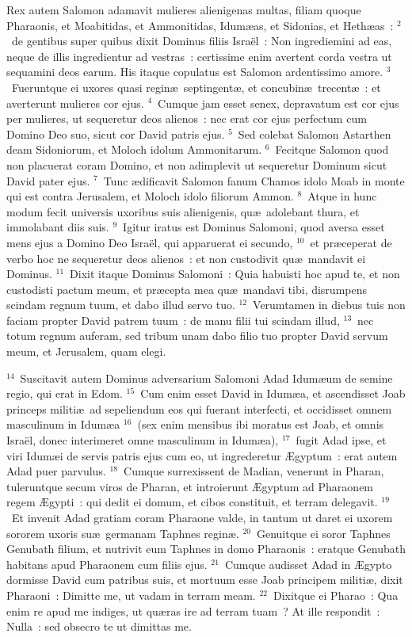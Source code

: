 \bchapter
\lettrine[lines=3,image=true,loversize=0.05,lraise=-0.03]{R}{}ex autem Salomon adamavit mulieres alienigenas multas, filiam quoque Pharaonis, et Moabitidas, et Ammonitidas, Idum\ae as, et Sidonias, et Heth\ae as~:
${}^{2}$~de gentibus super quibus dixit Dominus filiis Isra\"el~: Non ingrediemini ad eas, neque de illis ingredientur ad vestras~: certissime enim avertent corda vestra ut sequamini deos earum. His itaque copulatus est Salomon ardentissimo amore.
${}^{3}$~Fueruntque ei uxores quasi regin\ae\ septingent\ae , et concubin\ae\ trecent\ae~: et averterunt mulieres cor ejus.
${}^{4}$~Cumque jam esset senex, depravatum est cor ejus per mulieres, ut sequeretur deos alienos~: nec erat cor ejus perfectum cum Domino Deo suo, sicut cor David patris ejus.
${}^{5}$~Sed colebat Salomon Astarthen deam Sidoniorum, et Moloch idolum Ammonitarum.
${}^{6}$~Fecitque Salomon quod non placuerat coram Domino, et non adimplevit ut sequeretur Dominum sicut David pater ejus.
${}^{7}$~Tunc \ae dificavit Salomon fanum Chamos idolo Moab in monte qui est contra Jerusalem, et Moloch idolo filiorum Ammon.
${}^{8}$~Atque in hunc modum fecit universis uxoribus suis alienigenis, qu\ae\ adolebant thura, et immolabant diis suis.
${}^{9}$~Igitur iratus est Dominus Salomoni, quod aversa esset mens ejus a Domino Deo Isra\"el, qui apparuerat ei secundo,
${}^{10}$~et pr\ae ceperat de verbo hoc ne sequeretur deos alienos~: et non custodivit qu\ae\ mandavit ei Dominus.
${}^{11}$~Dixit itaque Dominus Salomoni~: Quia habuisti hoc apud te, et non custodisti pactum meum, et pr\ae cepta mea qu\ae\ mandavi tibi, disrumpens scindam regnum tuum, et dabo illud servo tuo.
${}^{12}$~Verumtamen in diebus tuis non faciam propter David patrem tuum~: de manu filii tui scindam illud,
${}^{13}$~nec totum regnum auferam, sed tribum unam dabo filio tuo propter David servum meum, et Jerusalem, quam elegi.


${}^{14}$~Suscitavit autem Dominus adversarium Salomoni Adad Idum\ae um de semine regio, qui erat in Edom.
${}^{15}$~Cum enim esset David in Idum\ae a, et ascendisset Joab princeps militi\ae\ ad sepeliendum eos qui fuerant interfecti, et occidisset omnem masculinum in Idum\ae a
${}^{16}$~(sex enim mensibus ibi moratus est Joab, et omnis Isra\"el, donec interimeret omne masculinum in Idum\ae a),
${}^{17}$~fugit Adad ipse, et viri Idum\ae i de servis patris ejus cum eo, ut ingrederetur \AE gyptum~: erat autem Adad puer parvulus.
${}^{18}$~Cumque surrexissent de Madian, venerunt in Pharan, tuleruntque secum viros de Pharan, et introierunt \AE gyptum ad Pharaonem regem \AE gypti~: qui dedit ei domum, et cibos constituit, et terram delegavit.
${}^{19}$~Et invenit Adad gratiam coram Pharaone valde, in tantum ut daret ei uxorem sororem uxoris su\ae\ germanam Taphnes regin\ae .
${}^{20}$~Genuitque ei soror Taphnes Genubath filium, et nutrivit eum Taphnes in domo Pharaonis~: eratque Genubath habitans apud Pharaonem cum filiis ejus.
${}^{21}$~Cumque audisset Adad in \AE gypto dormisse David cum patribus suis, et mortuum esse Joab principem militi\ae , dixit Pharaoni~: Dimitte me, ut vadam in terram meam.
${}^{22}$~Dixitque ei Pharao~: Qua enim re apud me indiges, ut qu\ae ras ire ad terram tuam~? At ille respondit~: Nulla~: sed obsecro te ut dimittas me.


